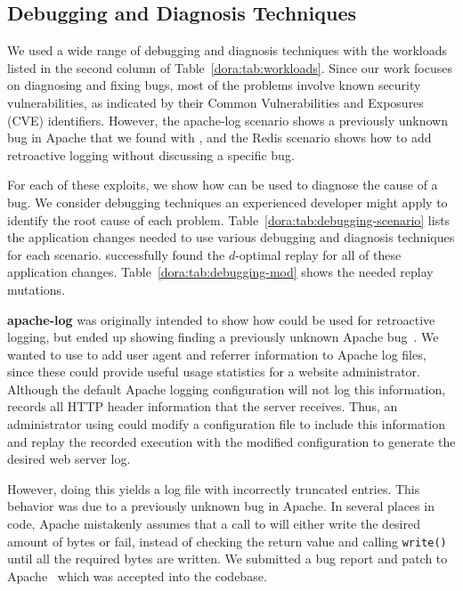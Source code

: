 \subsection{Debugging and Diagnosis Techniques}
\label{dora:sec:debugging}

We used a wide range of debugging and diagnosis techniques with the
workloads listed in the second column of Table~\ref{dora:tab:workloads}.
Since our work focuses on diagnosing and fixing bugs,
most of the problems involve known security vulnerabilities,
as indicated by their Common Vulnerabilities and Exposures (CVE) identifiers.
However, the apache-log scenario shows a previously unknown bug in Apache
that we found with {\dora}, and the Redis scenario shows how to add
retroactive logging without discussing a specific bug.

For each of these exploits, we show how {\dora} can be used to diagnose
the cause of a bug. We consider debugging techniques an experienced
developer might apply to identify the root cause of each problem.
Table~\ref{dora:tab:debugging-scenario} lists the application changes needed to use various
debugging and diagnosis techniques for each scenario.
{\dora} successfully found the $d$-optimal replay for all of these
application changes. Table~\ref{dora:tab:debugging-mod} shows the needed replay mutations.

{\bf apache-log} was originally intended to show how {\dora} could be used
for retroactive logging, but ended up
showing {\dora} finding a previously unknown Apache bug~\cite{apache-bug-53131}.
We wanted to use {\dora} to add user agent and referrer information to Apache
log files, since these could provide useful usage statistics for a website
administrator. Although the default Apache logging configuration will not log
this information, {\dora} records all HTTP
header information that the server receives. Thus, an administrator using {\dora}
could modify a configuration file to include this information
and replay the recorded execution with the modified configuration
to generate the desired web server log.

However, doing
this yields a log file with incorrectly truncated entries. This
behavior was due to a
previously unknown bug in Apache.
In several places in code, Apache mistakenly assumes that a call
to  will either write the desired amount of bytes or
fail, instead of checking the return
value and calling {\tt write()} until all the required bytes are
written. We submitted a bug report and patch to Apache~\cite{apache-bug-53131} which was
accepted into the codebase.

